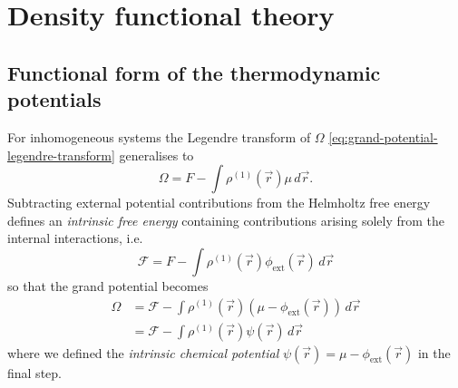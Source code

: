 \section{Density functional theory}

\subsection{Functional form of the thermodynamic potentials}


For inhomogeneous systems the Legendre transform of $\Omega$ \eqref{eq:grand-potential-legendre-transform} generalises to
\begin{equation}
  \Omega = F - \int \rho^{(1)}(\vec{r}) \mu \, d\vec{r}.
\end{equation}
Subtracting external potential contributions from the Helmholtz free energy defines an \emph{intrinsic free energy} containing contributions arising solely from the internal interactions, i.e.\
\begin{equation}\label{eq:intrinsic-free-energy}
  \mathcal{F}
  =
  F - \int \rho^{(1)}(\vec{r}) \phi_\mathrm{ext}(\vec{r}) \, d\vec{r}
\end{equation}
so that the grand potential becomes
\begin{equation}\label{eq:dft-grand-potential}
  \begin{split}
    \Omega
    &=
    \mathcal{F}
    - \int \rho^{(1)}(\vec{r}) (\mu - \phi_\mathrm{ext}(\vec{r})) \, d\vec{r}
    \\ &=
    \mathcal{F}
    - \int \rho^{(1)}(\vec{r}) \psi(\vec{r}) \, d\vec{r}
  \end{split}
\end{equation}
where we defined the \emph{intrinsic chemical potential} $\psi(\vec{r}) = \mu - \phi_\mathrm{ext}(\vec{r})$ in the final step.


